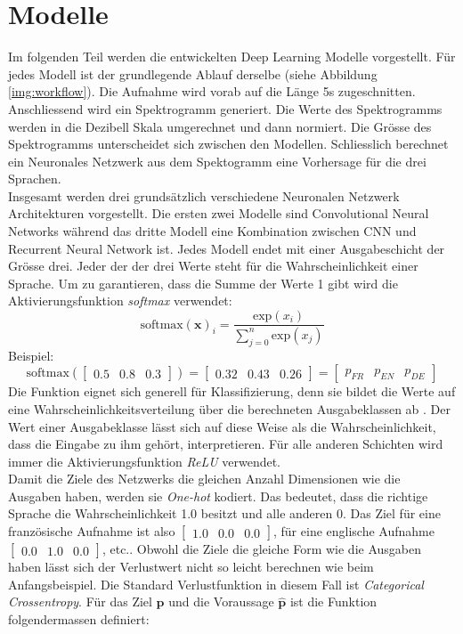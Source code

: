           \section{Modelle}
Im folgenden Teil werden die entwickelten Deep Learning Modelle vorgestellt. Für jedes Modell ist der grundlegende Ablauf derselbe (siehe Abbildung \ref{img:workflow}). Die Aufnahme wird vorab auf die Länge 5s zugeschnitten. Anschliessend wird ein Spektrogramm generiert. Die Werte des Spektrogramms werden in die Dezibell Skala umgerechnet und dann normiert. Die Grösse des Spektrogramms unterscheidet sich zwischen den Modellen. Schliesslich berechnet ein Neuronales Netzwerk aus dem Spektogramm eine Vorhersage für die drei Sprachen. 
\\
Insgesamt werden drei grundsätzlich verschiedene Neuronalen Netzwerk Architekturen vorgestellt. Die ersten zwei Modelle sind Convolutional Neural Networks während das dritte Modell eine Kombination zwischen CNN und Recurrent Neural Network ist. Jedes Modell endet mit einer Ausgabeschicht der Grösse drei. Jeder der der drei Werte steht für die Wahrscheinlichkeit einer Sprache. Um zu garantieren, dass die Summe der Werte 1 gibt wird die Aktivierungsfunktion \textit{softmax} verwendet:
$$ \text{softmax}(\boldsymbol x)_i = \frac{\text{exp}(x_i)}{\sum_{j=0}^{n} \text{exp}(x_j)}$$
Beispiel: 
$$ \text{softmax}(\begin{bmatrix} 0.5 & 0.8 & 0.3\end{bmatrix}) = \begin{bmatrix} 0.32 & 0.43 & 0.26\end{bmatrix} = \begin{bmatrix} p_{FR} & p_{EN} & p_{DE}\end{bmatrix}$$
Die Funktion eignet sich generell für Klassifizierung, denn sie bildet die Werte auf eine Wahrscheinlichkeitsverteilung über die berechneten Ausgabeklassen ab \parencite[][S. 180-184]{goodfellow}. Der Wert einer Ausgabeklasse lässt sich auf diese Weise als die Wahrscheinlichkeit, dass die Eingabe zu ihm gehört, interpretieren. Für alle anderen Schichten wird immer die Aktivierungsfunktion \textit{ReLU} verwendet.
\\
Damit die Ziele des Netzwerks die gleichen Anzahl Dimensionen wie die Ausgaben haben, werden sie \textit{One-hot}\parencite{chollet} kodiert. Das bedeutet, dass die richtige Sprache die Wahrscheinlichkeit 1.0 besitzt und alle anderen 0. Das Ziel für eine französische Aufnahme ist also $\begin{bmatrix} 1.0 & 0.0 & 0.0\end{bmatrix}$, für eine englische Aufnahme $\begin{bmatrix} 0.0 & 1.0 & 0.0\end{bmatrix}$, etc.. Obwohl die Ziele die gleiche Form wie die Ausgaben haben lässt sich der Verlustwert nicht so leicht berechnen wie beim Anfangsbeispiel. Die Standard Verlustfunktion in diesem Fall ist \textit{Categorical Crossentropy}\parencite{chollet}. Für das Ziel $\boldsymbol{p}$ und die Voraussage $\boldsymbol{\hat{p}}$ ist die Funktion folgendermassen definiert:

